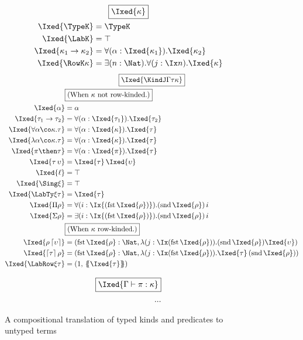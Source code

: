 \documentclass[authoryear,acmsmall,screen]{acmart}
\newcommand\Lift[1]{\ensuremath{\lceil #1 \rceil}}
\newcommand\Fst{\mathrm{fst}}
\newcommand\Snd{\mathrm{snd}}
\newcommand\Felim[1]{\{\!\!\{#1\}\!\!\}}
\begin{document}
\begin{figure}[H]
\begin{gather*}
\fbox{$\Ixed{\kappa}$} \\
\begin{align*}
\vspace{5em}
\Ixed{\TypeK} &= \TypeK \\
\Ixed{\LabK} &= \top \\
\Ixed{\kappa_1 \to \kappa_2} &= \forall (\alpha : \Ixed{\kappa_1}). \Ixed{\kappa_2} \\
\Ixed{\RowK \kappa} &= \exists(n : \Nat). \forall (j : \Ix  n). \Ixed{\kappa} \\
\end{align*}
\end{gather*}
\begin{gather*}
\fbox{$\Ixed{\KindJ \Gamma \tau \kappa}$} \\
\begin{align*}
\vspace{5em}
&\fbox{(When $\kappa$ not row-kinded.)} \\
\Ixed{\alpha} &= \alpha \\
\Ixed{\tau_1 \to \tau_2} &= \forall (\alpha : \Ixed{\tau_1}).\Ixed{\tau_2} \\
\Ixed{\forall \alpha \co \kappa. \tau} &= \forall (\alpha : \Ixed{\kappa}).\Ixed{\tau} \\
\Ixed{\lambda \alpha \co \kappa. \tau} &= \forall (\alpha : \Ixed{\kappa}).\Ixed{\tau} \\
\Ixed{\pi \then \tau} &= \forall (\alpha : \Ixed{\pi}). \Ixed{\tau} \\
\Ixed{\tau \, \upsilon} &= \Ixed{\tau} \, \Ixed{\upsilon} \\
\Ixed{\ell} &= \top  \\
\Ixed{\Sing \xi} &= \top  \\
\Ixed{\LabTy \xi \tau}&= \Ixed{\tau}  \\
\Ixed{\Pi \rho}&=  \forall(i : \Ix{(\Fst \, \Ixed{\rho})}). (\Snd \, \Ixed{\rho}) \, i\\
\Ixed{\Sigma \rho}&= \exists (i : \Ix{(\Fst \, \Ixed{\rho})}). (\Snd \, \Ixed{\rho}) \, i\\
&\fbox{(When $\kappa$ row-kinded.)} \\
\Ixed{\rho \, \Lift{\upsilon}} &= (\Fst \, \Ixed{\rho} : \Nat, \lambda (j : \Ix (\Fst \, \Ixed{\rho})). (\Snd \, \Ixed{\rho}) \Ixed{\upsilon})\\
\Ixed{\Lift{\tau} \, \rho} &= (\Fst \, \Ixed{\rho} : \Nat, \lambda (j : \Ix (\Fst \, \Ixed{\rho})). \Ixed{\tau} \, (\Snd \, \Ixed{\rho}))\\
\Ixed{\LabRow \xi \tau}&= (1, \, \Felim{\Ixed{\tau}} )  \\
\end{align*}
\end{gather*}

\begin{align*}
\fbox{$\Ixed{\Gamma \vdash \pi : \kappa}$} \\
\vspace{5em}
...
\end{align*}
\caption{A compositional translation of typed \RO kinds and predicates to untyped \IX{} terms}
\label{fig:translation}
\end{figure}
\end{document}
